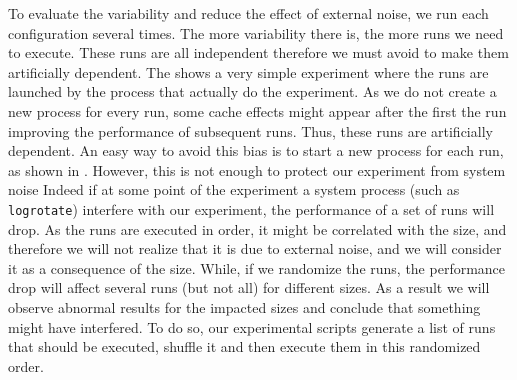 To evaluate the variability and reduce the effect of external noise, we run each configuration several times.
The more variability there is, the more runs we need to execute.
These runs are all independent therefore we must avoid to make them artificially dependent.
The  shows a very simple experiment where the runs are launched by the process that actually do the experiment.
As we do not create a new process for every run, some cache effects might appear after the first the run improving the performance of subsequent runs.
Thus, these runs are artificially dependent.
An easy way to avoid this bias is to start a new process for each run, as shown in .
However, this is not enough to protect our experiment from system noise
Indeed if at some point of the experiment a system process (such as \texttt{logrotate}) interfere with our experiment, the performance of a set of runs will drop.
As the runs are executed in order, it might be correlated with the size, and therefore we will not realize that it is due to external noise, and we will consider it as a consequence of the size.
While, if we randomize the runs, the performance drop will affect several runs (but not all) for different sizes.
As a result we will observe abnormal results for the impacted sizes and conclude that something might have interfered.
To do so, our experimental scripts generate a list of runs that should be executed, shuffle it and then execute them in this randomized order.

